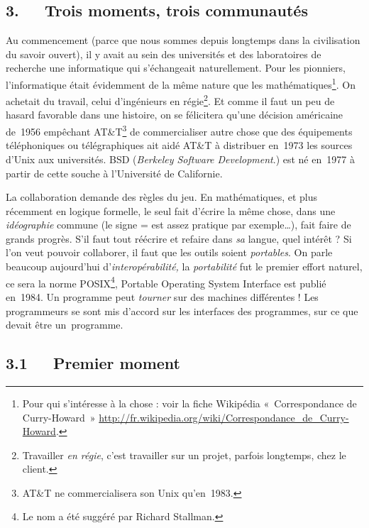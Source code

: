 \documentclass{FramateX}
\begin{document}
\begin{refsection}
\section*{3.~~~Trois moments, trois communautés}
{}

Au commencement (parce que nous sommes depuis longtemps dans la
civilisation du savoir ouvert), il y avait au sein des universités et
des laboratoires de recherche une informatique qui s'échangeait
naturellement. Pour les pionniers, l'informatique était évidemment de
la même nature que les mathématiques\footnote{Pour qui
s'intéresse à la chose : voir la fiche Wikipédia «~Correspondance de Curry-Howard~» 
\url{http://fr.wikipedia.org/wiki/Correspondance_de_Curry-Howard}.}. On
achetait du travail, celui d'ingénieurs en régie\footnote{Travailler
\textit{en régie}, c'est travailler sur un projet, parfois longtemps,
chez le client.}. Et comme il faut un peu de hasard favorable dans une
histoire, on se félicitera qu'une décision américaine de~1956 empêchant
AT\&T\footnote{AT\&T ne commercialisera son Unix qu'en~1983.} de
commercialiser autre chose que des équipements téléphoniques ou
télégraphiques ait aidé AT\&T à distribuer en~1973 les sources d'Unix
aux universités. BSD (\textit{Berkeley Software Development}.) est né
en~1977 à partir de cette souche à l'Université de Californie. 

La collaboration demande des règles du jeu. En mathématiques, et plus
récemment en logique formelle, le seul fait d'écrire la même chose,
dans une \textit{idéographie} commune (le signe = est assez pratique
par exemple…), fait faire de grands progrès. S'il faut tout réécrire et
refaire dans \textit{sa} langue, quel intérêt ? Si l'on veut pouvoir
collaborer, il faut que les outils soient \textit{portables}. On parle
beaucoup aujourd'hui d'\textit{interopérabilité,} la
\textit{portabilité} fut le premier effort naturel, ce sera la norme
POSIX\footnote{Le nom a été suggéré par Richard Stallman.}, Portable
Operating System Interface est publié en~1984. Un programme peut
\textit{tourner} sur des machines différentes ! Les programmeurs se
sont mis d'accord sur les interfaces des programmes, sur ce que devait
être un~programme.

\subsection*{3.1~~~Premier moment}
{}




\end{refsection}
\end{document}
